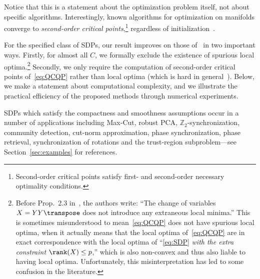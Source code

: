 \documentclass{article}
\newcommand{\1}{\mathbf{1}}
\begin{document}
Notice that this is a statement about the optimization problem itself, not about specific algorithms. Interestingly, known algorithms for optimization on manifolds converge to \emph{second-order critical points},\footnote{Second-order critical points satisfy first- and second-order necessary optimality conditions.} regardless of initialization~\citep{boumal2016globalrates}.

For the specified class of SDPs, our result improves on those of~\citep{burer2005local} in two important ways. Firstly, for almost all $C$, we formally exclude the existence of spurious local optima.\footnote{Before Prop.\ 2.3 in~\citep{burer2005local}, the authors write: ``The change of variables $X = YY\transpose$ does not introduce any extraneous local minima.'' This is sometimes misunderstood to mean~\eqref{eq:QCQP} does not have spurious local optima, when it actually means that the local optima of~\eqref{eq:QCQP} are in exact correspondence with the local optima of ``\eqref{eq:SDP} \emph{with the extra constraint $\rank(X) \leq p$},'' which is also non-convex and thus also liable to having local optima. Unfortunately, this misinterpretation has led to some confusion in the literature.} Secondly, we only require the computation of second-order critical points of~\eqref{eq:QCQP} rather than local optima (which is hard in general~\citep{vavasis1991nonlinear}). Below, we make a statement about computational complexity, and we illustrate the practical efficiency of the proposed methods through numerical experiments.

SDPs which satisfy the compactness and smoothness assumptions occur in a number of applications including Max-Cut, robust PCA,  $\mathbb{Z}_2$-synchronization, community detection, cut-norm approximation, phase synchronization, phase retrieval, synchronization of rotations and the trust-region subproblem---see Section~\ref{sec:examples} for references.



\end{document}
